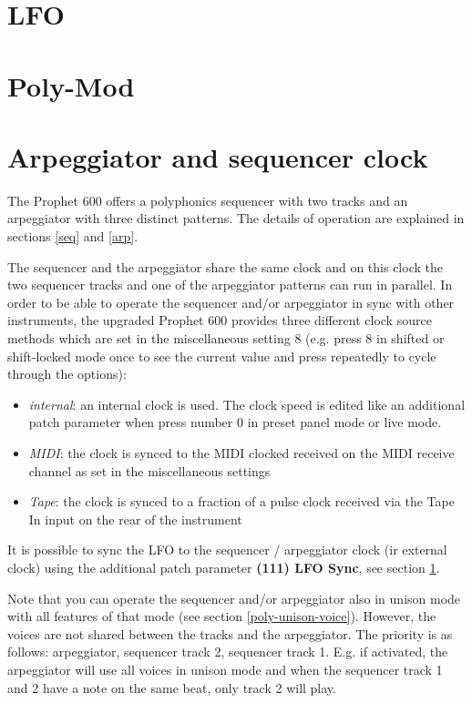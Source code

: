 \documentclass[landscape, 11pt, oneside]{report}
\newenvironment{flowtext}{\addmargin[0cm]{7cm}}{\endaddmargin} %
\begin{document}
\begin{flowtext}


\section{LFO}\label{lfo}



\section{Poly-Mod}\label{polymod}



\section{Arpeggiator and sequencer clock}\label{sync}

The Prophet 600 offers a polyphonics sequencer with two tracks and an arpeggiator with three distinct patterns. The details of operation are explained in sections \ref{seq} and \ref{arp}.

The sequencer and the arpeggiator share the same clock and on this clock the two sequencer tracks and one of the arpeggiator patterns can run in parallel. In order to be able to operate the sequencer and/or arpeggiator in sync with other instruments, the upgraded Prophet 600 provides three different clock source methods which are set in the miscellaneous setting 8 (e.g. press 8 in shifted or shift-locked mode once to see the current value and press repeatedly to cycle through the options):
\begin{itemize}
  \item \textit{internal}: an internal clock is used. The clock speed is edited like an additional patch parameter when press number 0 in preset panel mode or live mode.
  \item \textit{MIDI}: the clock is synced to the MIDI clocked received on the MIDI receive channel as set in the  miscellaneous settings
  \item \textit{Tape}: the clock is synced to a fraction of a pulse clock received via the Tape In input on the rear of the instrument
\end{itemize}  

It is possible to sync the LFO to the sequencer / arpeggiator clock (ir external clock) using the additional patch parameter \textbf{(111) LFO Sync}, see section \ref{lfo}.

Note that you can operate the sequencer and/or arpeggiator also in unison mode with all features of that mode (see section \ref{poly-unison-voice}). However, the voices are not shared between the tracks and the arpeggiator. The priority is as follows: arpeggiator, sequencer track 2, sequencer track 1. E.g. if activated, the arpeggiator will use all voices in unison mode and when the sequencer track 1 and 2 have a note on the same beat, only track 2 will play.


\end{flowtext}
\end{document}
